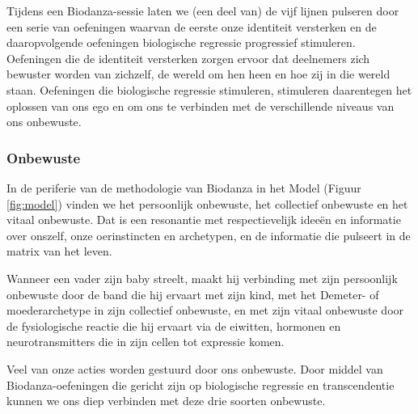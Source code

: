 \documentclass[
  11pt,
]{book}
\begin{document}
Tijdens een Biodanza-sessie laten we (een deel van) de vijf lijnen pulseren door een serie van oefeningen waarvan de eerste onze identiteit versterken en de daaropvolgende oefeningen biologische regressie progressief stimuleren. Oefeningen die de identiteit versterken zorgen ervoor dat deelnemers zich bewuster worden van zichzelf, de wereld om hen heen en hoe zij in die wereld staan. Oefeningen die biologische regressie stimuleren, stimuleren daarentegen het oplossen van ons ego en om ons te verbinden met de verschillende niveaus van ons onbewuste.

\subsubsection{Onbewuste}\label{onbewuste}

In de periferie van de methodologie van Biodanza in het Model (Figuur \ref{fig:model}) vinden we het persoonlijk onbewuste, het collectief onbewuste en het vitaal onbewuste. Dat is een resonantie met respectievelijk ideeën en informatie over onszelf, onze oerinstincten en archetypen, en de informatie die pulseert in de matrix van het leven.

Wanneer een vader zijn baby streelt, maakt hij verbinding met zijn persoonlijk onbewuste door de band die hij ervaart met zijn kind, met het Demeter- of moederarchetype in zijn collectief onbewuste, en met zijn vitaal onbewuste door de fysiologische reactie die hij ervaart via de eiwitten, hormonen en neurotransmitters die in zijn cellen tot expressie komen.

Veel van onze acties worden gestuurd door ons onbewuste. Door middel van Biodanza-oefeningen die gericht zijn op biologische regressie en transcendentie kunnen we ons diep verbinden met deze drie soorten onbewuste.
\end{document}
